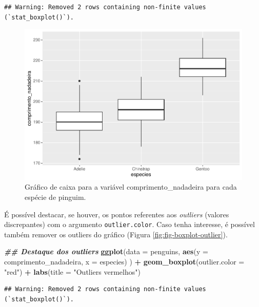 \documentclass[
]{article}
\newenvironment{Shaded}{\begin{snugshade}}{\end{snugshade}}
\newcommand{\AttributeTok}[1]{\textcolor[rgb]{0.13,0.29,0.53}{#1}}
\newcommand{\DocumentationTok}[1]{\textcolor[rgb]{0.56,0.35,0.01}{\textbf{\textit{#1}}}}
\newcommand{\FunctionTok}[1]{\textcolor[rgb]{0.13,0.29,0.53}{\textbf{#1}}}
\newcommand{\NormalTok}[1]{#1}
\newcommand{\SpecialCharTok}[1]{\textcolor[rgb]{0.81,0.36,0.00}{\textbf{#1}}}
\newcommand{\StringTok}[1]{\textcolor[rgb]{0.31,0.60,0.02}{#1}}
\begin{document}
\begin{verbatim}
## Warning: Removed 2 rows containing non-finite values (`stat_boxplot()`).
\end{verbatim}

\begin{figure}
\includegraphics[width=0.75\linewidth,height=0.75\textheight]{epr_files/figure-latex/fig-boxplot-1} \caption{Gráfico de caixa para a variável comprimento_nadadeira para cada espécie de pinguim.}\label{fig:fig-boxplot}
\end{figure}

É possível destacar, se houver, os pontos referentes aos \emph{outliers} (valores discrepantes) com o argumento \texttt{outlier.color}. Caso tenha interesse, é possível também remover os outliers do gráfico (Figura \ref{fig:fig-boxplot-outlier}).

\begin{Shaded}
\begin{Highlighting}[]
\DocumentationTok{\#\# Destaque dos outliers}
\FunctionTok{ggplot}\NormalTok{(}\AttributeTok{data =}\NormalTok{ penguins, }
       \FunctionTok{aes}\NormalTok{(}\AttributeTok{y =}\NormalTok{ comprimento\_nadadeira, }\AttributeTok{x =}\NormalTok{ especies)}
\NormalTok{       ) }\SpecialCharTok{+}
    \FunctionTok{geom\_boxplot}\NormalTok{(}\AttributeTok{outlier.color =} \StringTok{"red"}\NormalTok{) }\SpecialCharTok{+}
    \FunctionTok{labs}\NormalTok{(}\AttributeTok{title =} \StringTok{"Outliers vermelhos"}\NormalTok{)}
\end{Highlighting}
\end{Shaded}

\begin{verbatim}
## Warning: Removed 2 rows containing non-finite values (`stat_boxplot()`).
\end{verbatim}
\end{document}
